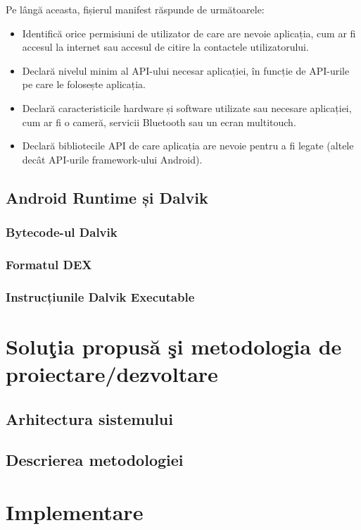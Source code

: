 \documentclass[12pt,a4paper]{report}
\begin{document}
Pe lângă aceasta, fișierul manifest răspunde de următoarele:
\begin{itemize}
    \item Identifică orice permisiuni de utilizator de care are nevoie aplicația, cum ar fi accesul la internet sau accesul de citire la contactele utilizatorului.
    \item Declară nivelul minim al API-ului necesar aplicației, în funcție de API-urile pe care le folosește aplicația.
    \item Declară caracteristicile hardware și software utilizate sau necesare aplicației, cum ar fi o cameră, servicii Bluetooth sau un ecran multitouch.
    \item Declară bibliotecile API de care aplicația are nevoie pentru a fi legate (altele decât API-urile framework-ului Android).
\end{itemize}

\section{Android Runtime și Dalvik}
\subsection{Bytecode-ul Dalvik}
\subsection{Formatul DEX}
\subsection{Instrucțiunile Dalvik Executable}

\chapter{Soluţia propusă şi metodologia de proiectare/dezvoltare}
\section{Arhitectura sistemului}
\section{Descrierea metodologiei}

\chapter{Implementare}
\end{document}

